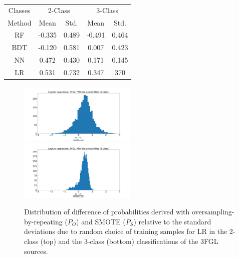 \documentclass{aa}
\begin{document}
\begin{appendix}
\begin{table}[!h]
\begin{tabular}{c c c c c}
\hline
\hline
Classes&\multicolumn{2}{c}{2-Class}&\multicolumn{2}{c}{3-Class}\\
Method & Mean&Std.&Mean&Std.\\
\hline
RF& -0.335 & 0.489&-0.491&0.464\\
\hline
BDT&-0.120&0.581 &0.007&0.423\\
\hline
NN&0.472&0.430&0.171&0.145\\
\hline
LR&0.531&0.732&0.347&370\\
\end{tabular}
\vspace{2mm}
\end{table}
\begin{figure}[h!]
\centering
\includegraphics[width=0.5\textwidth]{plots/hist_diff_smote_LR_3FGL_2class.pdf}
\includegraphics[width=0.5\textwidth]{plots/hist_diff_smote_LR_3FGL_3class.pdf}
\caption{Distribution of difference  of probabilities derived with oversampling-by-repeating ($P_O$) and SMOTE ($P_S$) 
relative to the standard deviations due to random choice of training samples
for LR in the 2-class (top) and the 3-class (bottom) classifications of the 3FGL sources.
}
\label{fig:OvsS_3FGL_PSR}
\end{figure}


\end{appendix}
\end{document}
